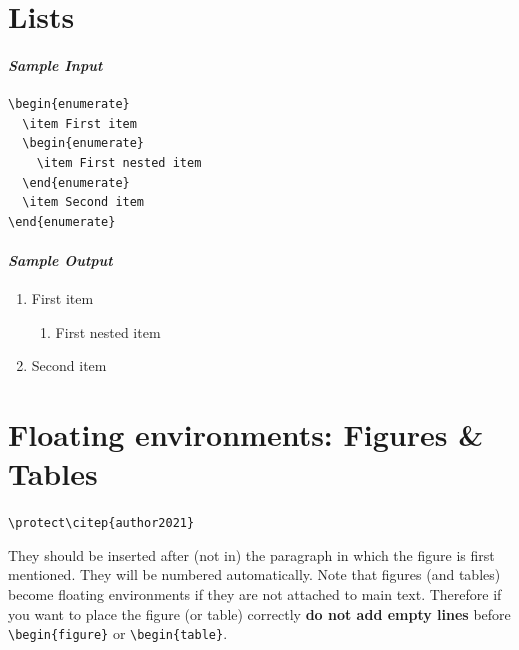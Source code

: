 \documentclass[usenatbib]{tjaa}
\begin{document}
\section{Lists}

\paragraph*{\itshape Sample Input}
\begin{verbatim}
\begin{enumerate}
  \item First item
  \begin{enumerate}
    \item First nested item
  \end{enumerate}
  \item Second item
\end{enumerate}
\end{verbatim}
\paragraph*{\itshape Sample Output}
\begin{enumerate}
  \item First item
  \begin{enumerate}
    \item First nested item
  \end{enumerate}
  \item Second item
\end{enumerate}

\newpage
\section{Floating environments: Figures \& Tables}
\begin{lrbox}{\verbbox}
\verb|\protect\citep{author2021}|
\end{lrbox}

They should be inserted after (not in) the  paragraph in which the figure is
first mentioned.
They will be numbered automatically.
Note that figures (and tables) become floating environments if they are not
attached to main text.
Therefore if you want to place the figure (or table) correctly
\textbf{do not add empty lines} before \verb|\begin{figure}| or
\verb|\begin{table}|.
\end{document}
